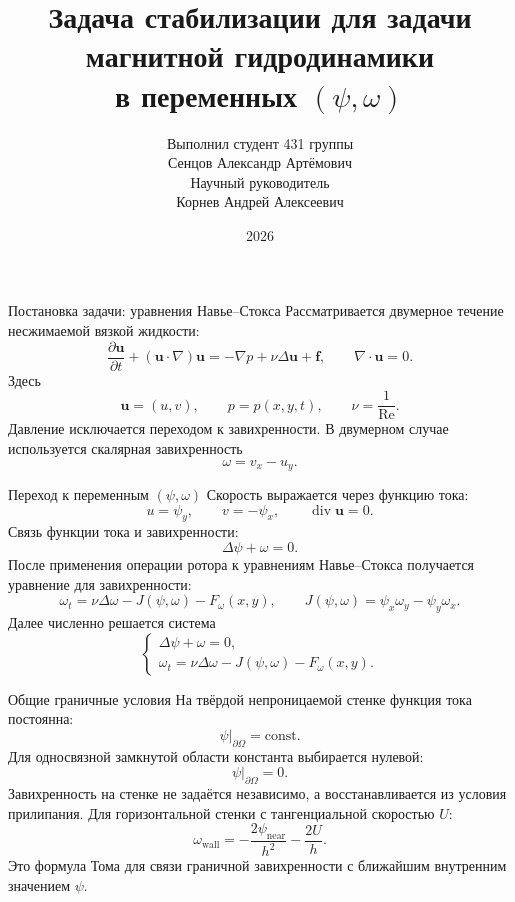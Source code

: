 \documentclass[aspectratio=169,10pt]{beamer}
\title[Стабилизация в переменных \(\psi,\omega\)]{Задача стабилизации для задачи магнитной гидродинамики\\в переменных \((\psi,\omega)\)}
\author{Выполнил студент 431 группы\\Сенцов Александр Артёмович\\[0.6em]
Научный руководитель\\Корнев Андрей Алексеевич}
\institute{Механико-математический факультет МГУ}
\date{2026}
\newcommand{\Reynolds}{\operatorname{Re}}
\newcommand{\Laplace}{\Delta}
\newcommand{\J}{J}
\begin{document}
\begin{frame}
    \titlepage
\end{frame}

\begin{frame}{Постановка задачи: уравнения Навье--Стокса}
    Рассматривается двумерное течение несжимаемой вязкой жидкости:
    \[
        \frac{\partial \mathbf u}{\partial t}
        +
        (\mathbf u\cdot\nabla)\mathbf u
        =
        -\nabla p
        +
        \nu\Laplace \mathbf u
        +
        \mathbf f,
        \qquad
        \nabla\cdot\mathbf u=0.
    \]
    Здесь
    \[
        \mathbf u=(u,v),\qquad
        p=p(x,y,t),\qquad
        \nu=\frac{1}{\Reynolds}.
    \]
    Давление исключается переходом к завихренности.
    В двумерном случае используется скалярная завихренность
    \[
        \omega = v_x-u_y.
    \]
\end{frame}

\begin{frame}{Переход к переменным \((\psi,\omega)\)}
    Скорость выражается через функцию тока:
    \[
        u=\psi_y,\qquad v=-\psi_x,\qquad
        \operatorname{div}\mathbf u=0.
    \]
    Связь функции тока и завихренности:
    \[
        \Laplace\psi+\omega=0.
    \]
    После применения операции ротора к уравнениям Навье--Стокса получается уравнение для завихренности:
    \[
        \omega_t
        =
        \nu\Laplace\omega
        -
        \J(\psi,\omega)
        -
        F_\omega(x,y),
        \qquad
        \J(\psi,\omega)=\psi_x\omega_y-\psi_y\omega_x.
    \]
    Далее численно решается система
    \[
        \begin{cases}
        \Laplace\psi+\omega=0,\\
        \omega_t=\nu\Laplace\omega-\J(\psi,\omega)-F_\omega(x,y).
        \end{cases}
    \]
\end{frame}

\begin{frame}{Общие граничные условия}
    На твёрдой непроницаемой стенке функция тока постоянна:
    \[
        \psi\big|_{\partial\Omega}=\mathrm{const}.
    \]
    Для односвязной замкнутой области константа выбирается нулевой:
    \[
        \psi\big|_{\partial\Omega}=0.
    \]
    Завихренность на стенке не задаётся независимо, а восстанавливается из условия прилипания.
    Для горизонтальной стенки с тангенциальной скоростью \(U\):
    \[
        \omega_{\mathrm{wall}}
        =
        -\frac{2\psi_{\mathrm{near}}}{h^2}
        -
        \frac{2U}{h}.
    \]
    Это формула Тома для связи граничной завихренности с ближайшим внутренним значением \(\psi\).
\end{frame}
\end{document}
